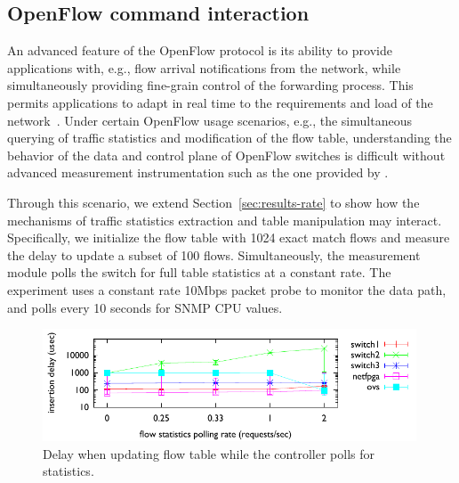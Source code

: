 \subsection{OpenFlow command interaction}\label{sec:results-interactions}


An advanced feature of the OpenFlow protocol is its ability to
provide applications with, e.g., flow arrival notifications from the 
network, while simultaneously providing fine-grain control of 
the forwarding process. This permits applications to adapt
in real time to the requirements and load of the
network~\cite{plug_n_serv,Yap09}. Under certain OpenFlow usage
scenarios, e.g., the simultaneous querying of traffic statistics and
modification of the flow table, understanding the behavior of the data
and control plane of OpenFlow switches is difficult without advanced
measurement instrumentation such as the one provided by \oflops. 

Through this scenario, we extend Section~\ref{sec:results-rate} to show 
how the mechanisms of traffic statistics extraction and table manipulation 
may interact. Specifically, we initialize the flow table with 1024 exact
match flows and measure the delay to update a subset of 100 flows. 
Simultaneously, the measurement module polls the switch for full table 
statistics at a constant rate. The experiment uses a constant rate 10Mbps 
packet probe to monitor the data path, and polls every 10 seconds for SNMP 
CPU values.

\begin{figure}[t!!]
  \begin{center}
    \includegraphics[width=0.99\textwidth]{interaction_test}
  \end{center}
  \caption{Delay when updating  flow table while the controller polls
    for statistics.}
  \label{fig:interaction_test}
\end{figure}


